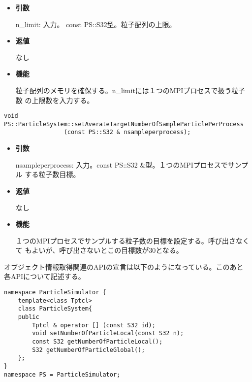 \begin{itemize}

\item {\bf 引数}

n\_limit: 入力。 const PS::S32型。粒子配列の上限。


\item {\bf 返値}

なし

\item {\bf 機能}

粒子配列のメモリを確保する。n\_limitには１つのMPIプロセスで扱う粒子数
の上限数を入力する。

\end{itemize}


\begin{screen}
\begin{verbatim}
void PS::ParticleSystem::setAverateTargetNumberOfSampleParticlePerProcess
                 (const PS::S32 & nsampleperprocess);
\end{verbatim}
\end{screen}

\begin{itemize}

\item {\bf 引数}

nsampleperprocess: 入力。const PS::S32 \&型。１つのMPIプロセスでサンプル
する粒子数目標。

\item {\bf 返値}

なし

\item {\bf 機能}

１つのMPIプロセスでサンプルする粒子数の目標を設定する。呼び出さなくて
もよいが、呼び出さないとこの目標数が30となる。

\end{itemize}


オブジェクト情報取得関連のAPIの宣言は以下のようになっている。このあと
各APIについて記述する。
\begin{lstlisting}[caption=ParticleSystem2]
namespace ParticleSimulator {
    template<class Tptcl>
    class ParticleSystem{
    public
        Tptcl & operator [] (const S32 id);
        void setNumberOfParticleLocal(const S32 n);
        const S32 getNumberOfParticleLocal();
        S32 getNumberOfParticleGlobal();
    };
}
namespace PS = ParticleSimulator;
\end{lstlisting}



